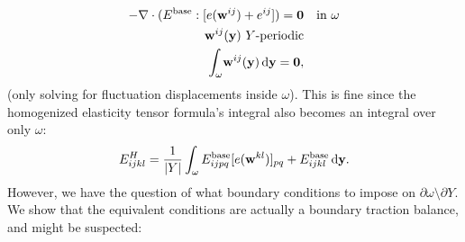 \documentclass[10pt]{article}
\begin{document}
\begin{align*}
    -\nabla \cdot (E^\text{base} : [e({\bf w}^{ij}) + e^{ij}]) = {\bf 0} & \quad \text{in } \omega \\
    {\bf w}^{ij}({\bf y})\ Y \text{-periodic} & \\
    \int_\omega \! {\bf w}^{ij}({\bf y})  \, \mathrm{d} {\bf y} =  {\bf 0}, 
\end{align*}
(only solving for fluctuation displacements inside $\omega$). This is fine
since the homogenized elasticity tensor formula's integral also becomes an
integral over only $\omega$:
$$
E^H_{ijkl} = \frac{1}{|Y|} \int_\omega E_{ijpq}^\text{base} [e({\bf w}^{kl})]_{pq} + E_{ijkl}^\text{base} \, \mathrm{d} {\bf y}.
$$
However, we have the question of what boundary conditions to impose on
$\partial \omega \setminus \partial Y$. We show that the equivalent conditions
are actually a boundary traction balance, and might be suspected:
\end{document}
